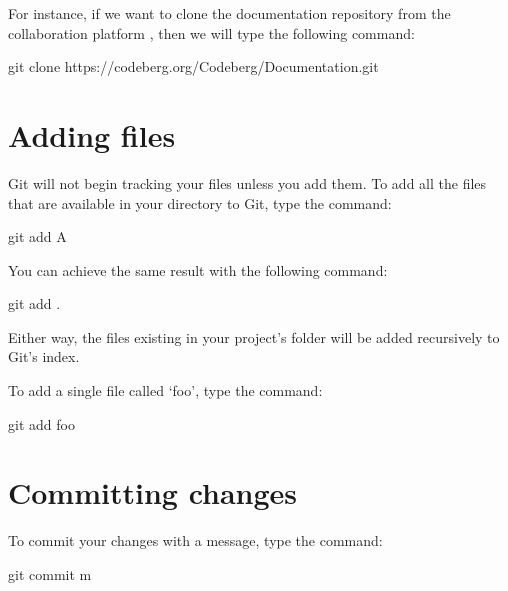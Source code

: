 \documentclass[a4paper,10pt,english,openany,oneside]{sphinxmanual}
\begin{document}
\sphinxAtStartPar
For instance, if we want to clone the documentation repository from the collaboration platform , then we will type the following command:

\begin{sphinxVerbatim}[commandchars=\\\{\}]
git clone https://codeberg.org/Codeberg/Documentation.git
\end{sphinxVerbatim}


\section{Adding files}
\label{\detokenize{gitinminutes:adding-files}}
\sphinxAtStartPar
Git will not begin tracking your files unless you add them. To add all the files that are available in your directory to Git, type the command:

\begin{sphinxVerbatim}[commandchars=\\\{\}]
git add \PYGZhy{}A
\end{sphinxVerbatim}

\sphinxAtStartPar
You can achieve the same result with the following command:

\begin{sphinxVerbatim}[commandchars=\\\{\}]
git add .
\end{sphinxVerbatim}

\sphinxAtStartPar
Either way, the files existing in your project’s folder will be added recursively to Git’s index.

\sphinxAtStartPar
To add a single file called ‘foo’, type the command:

\begin{sphinxVerbatim}[commandchars=\\\{\}]
git add foo
\end{sphinxVerbatim}


\section{Committing changes}
\label{\detokenize{gitinminutes:committing-changes}}
\sphinxAtStartPar
To commit your changes with a message, type the command:

\begin{sphinxVerbatim}[commandchars=\\\{\}]
git commit \PYGZhy{}m 
\end{sphinxVerbatim}
\end{document}
